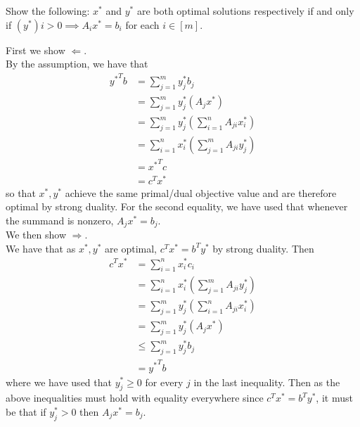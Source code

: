 \documentclass[11pt]{article}
\renewcommand{\leq}{\leqslant}
\renewcommand{\geq}{\geqslant}
\begin{document}
\begin{enumerate}[1)]
  \medskip
  \noindent

  Show the following: $x^*$ and $y^*$ are both optimal solutions respectively if and only if $(y^\ast)i > 0 \implies
A_ix^\ast = b_i$ for each $i \in [m]$.



\begin{solution}
First we show $\Leftarrow$. \\

By the assumption, we have that 
\begin{align*}
{y^\ast}^T b &= \displaystyle\sum_{j = 1}^m y^\ast_j b_j \\
& = \displaystyle\sum_{j = 1}^m y^\ast_j(A_j x^\ast) \\
& =\displaystyle\sum_{j = 1}^m  y^\ast_j \left( \displaystyle\sum_{i = 1}^n A_{ji} x^\ast_i \right) \\
&= \displaystyle\sum_{i = 1}^n  x^\ast_i \left( \displaystyle\sum_{j = 1}^m A_{ji} y^\ast_j \right) \\
& = {x^\ast}^T c \\
& = c^T x^\ast
\end{align*} 
so that $x^\ast, y^\ast$ achieve the same primal/dual objective value and are therefore optimal by strong duality. For the second equality, we have used that whenever the summand is nonzero, $A_j x^\ast = b_j$. \\

We then show $\Rightarrow$. \\

We have that as $x^\ast, y^\ast$ are optimal, $c^Tx^\ast = b^Ty^\ast$ by strong duality. Then 
\begin{align*}
c^Tx^\ast & = \displaystyle\sum_{i =1}^n x^\ast_i c_i \\
& =  \displaystyle\sum_{i =1}^n x^\ast_i \left( \displaystyle\sum_{j =1}^m A_{ji}y^\ast_j \right) \\
& = \displaystyle\sum_{j =1}^m y^\ast_j \left( \displaystyle\sum_{i =1}^n A_{ji}x^\ast_i \right) \\
& = \displaystyle\sum_{j =1}^m y^\ast_j (A_j x^\ast) \\
& \leq \displaystyle\sum_{j =1}^m y^\ast_j  b_j \\
& = {y^\ast}^T b
\end{align*}
where we have used that $y^\ast_j \geq 0$ for every $j$ in the last inequality. Then as the above inequalities must hold with equality everywhere since $c^Tx^\ast = b^Ty^\ast$, it must be that if $y^\ast_j >0$ then $A_j x^\ast = b_j$.


\end{solution}
\end{enumerate}
\end{document}
